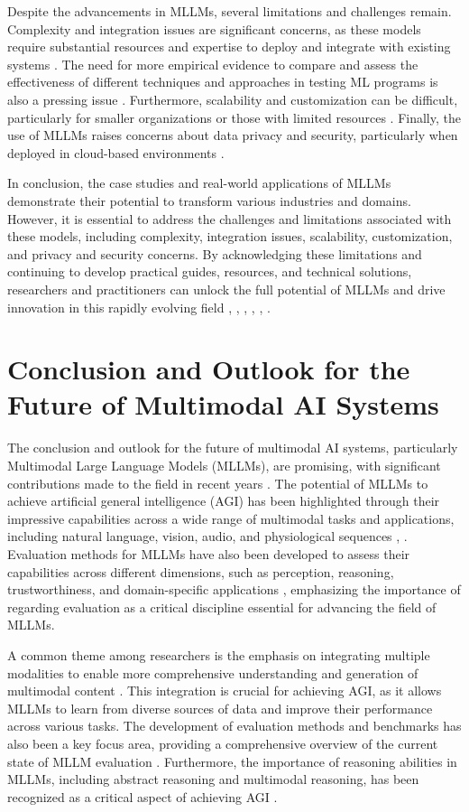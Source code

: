 \documentclass[conference]{IEEEtran}
\begin{document}
Despite the advancements in MLLMs, several limitations and challenges remain. Complexity and integration issues are significant concerns, as these models require substantial resources and expertise to deploy and integrate with existing systems \cite{b1}. The need for more empirical evidence to compare and assess the effectiveness of different techniques and approaches in testing ML programs is also a pressing issue \cite{b6}. Furthermore, scalability and customization can be difficult, particularly for smaller organizations or those with limited resources \cite{b2}. Finally, the use of MLLMs raises concerns about data privacy and security, particularly when deployed in cloud-based environments \cite{b5}.

In conclusion, the case studies and real-world applications of MLLMs demonstrate their potential to transform various industries and domains. However, it is essential to address the challenges and limitations associated with these models, including complexity, integration issues, scalability, customization, and privacy and security concerns. By acknowledging these limitations and continuing to develop practical guides, resources, and technical solutions, researchers and practitioners can unlock the full potential of MLLMs and drive innovation in this rapidly evolving field \cite{b1}, \cite{b2}, \cite{b3}, \cite{b4}, \cite{b5}, \cite{b6}.

\section{Conclusion and Outlook for the Future of Multimodal AI Systems}
The conclusion and outlook for the future of multimodal AI systems, particularly Multimodal Large Language Models (MLLMs), are promising, with significant contributions made to the field in recent years \cite{b1}. The potential of MLLMs to achieve artificial general intelligence (AGI) has been highlighted through their impressive capabilities across a wide range of multimodal tasks and applications, including natural language, vision, audio, and physiological sequences \cite{b2}, \cite{b3}. Evaluation methods for MLLMs have also been developed to assess their capabilities across different dimensions, such as perception, reasoning, trustworthiness, and domain-specific applications \cite{b4}, emphasizing the importance of regarding evaluation as a critical discipline essential for advancing the field of MLLMs.

A common theme among researchers is the emphasis on integrating multiple modalities to enable more comprehensive understanding and generation of multimodal content \cite{b5}. This integration is crucial for achieving AGI, as it allows MLLMs to learn from diverse sources of data and improve their performance across various tasks. The development of evaluation methods and benchmarks has also been a key focus area, providing a comprehensive overview of the current state of MLLM evaluation \cite{b6}. Furthermore, the importance of reasoning abilities in MLLMs, including abstract reasoning and multimodal reasoning, has been recognized as a critical aspect of achieving AGI \cite{b7}.
\end{document}
